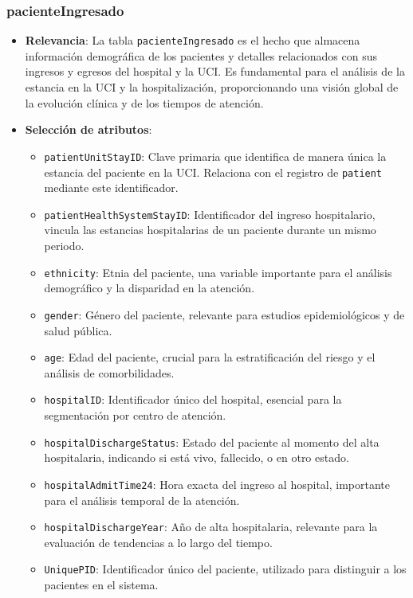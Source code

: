 \documentclass[12pt, a4paper, twoside]{article}
\begin{document}
	\subsubsection{pacienteIngresado}
	
	\begin{itemize}
		\item \textbf{Relevancia}: La tabla \texttt{pacienteIngresado} es el hecho que almacena información demográfica de los pacientes y detalles relacionados con sus ingresos y egresos del hospital y la UCI. Es fundamental para el análisis de la estancia en la UCI y la hospitalización, proporcionando una visión global de la evolución clínica y de los tiempos de atención.
		
		\item \textbf{Selección de atributos}:
		\begin{itemize}
			\item \texttt{patientUnitStayID}: Clave primaria que identifica de manera única la estancia del paciente en la UCI. Relaciona con el registro de \texttt{patient} mediante este identificador.
			\item \texttt{patientHealthSystemStayID}: Identificador del ingreso hospitalario, vincula las estancias hospitalarias de un paciente durante un mismo periodo.
			\item \texttt{ethnicity}: Etnia del paciente, una variable importante para el análisis demográfico y la disparidad en la atención.
			\item \texttt{gender}: Género del paciente, relevante para estudios epidemiológicos y de salud pública.
			\item \texttt{age}: Edad del paciente, crucial para la estratificación del riesgo y el análisis de comorbilidades.
			\item \texttt{hospitalID}: Identificador único del hospital, esencial para la segmentación por centro de atención.
			\item \texttt{hospitalDischargeStatus}: Estado del paciente al momento del alta hospitalaria, indicando si está vivo, fallecido, o en otro estado.
			\item \texttt{hospitalAdmitTime24}: Hora exacta del ingreso al hospital, importante para el análisis temporal de la atención.
			\item \texttt{hospitalDischargeYear}: Año de alta hospitalaria, relevante para la evaluación de tendencias a lo largo del tiempo.
			\item \texttt{UniquePID}: Identificador único del paciente, utilizado para distinguir a los pacientes en el sistema.
		\end{itemize}
		
	\end{itemize}
	
\end{document}
